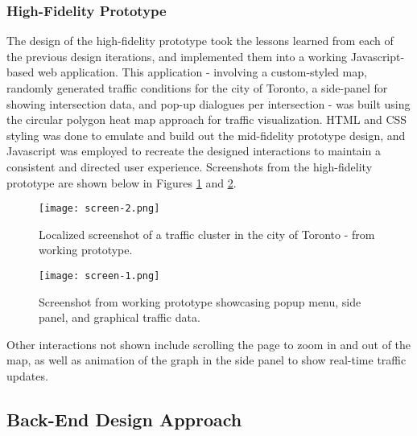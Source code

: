 \documentclass{article}
\begin{document}
\subsubsection{High-Fidelity Prototype}

The design of the high-fidelity prototype took the lessons learned from each of the previous design iterations, and implemented them into a working Javascript-based web application.
This application - involving a custom-styled map, randomly generated traffic conditions for the city of Toronto, a side-panel for showing intersection data, and pop-up dialogues per intersection - was built using the circular polygon heat map approach for traffic visualization.
HTML and CSS styling was done to emulate and build out the mid-fidelity prototype design, and Javascript was employed to recreate the designed interactions to maintain a consistent and directed user experience. Screenshots from the high-fidelity prototype are shown below in Figures \ref{fig:screen-1} and \ref{fig:screen-2}. \\

\begin{figure}[htbp!]
  \begin{centering}
    \texttt{[image: screen-2.png]}
    \caption{Localized screenshot of a traffic cluster in the city of Toronto - from working prototype.}
    \label{fig:screen-1}
  \end{centering}
\end{figure}

\begin{figure}[htbp!]
  \begin{centering}
    \texttt{[image: screen-1.png]}
    \caption{Screenshot from working prototype showcasing popup menu, side panel, and graphical traffic data.}
    \label{fig:screen-2}
  \end{centering}
\end{figure}

Other interactions not shown include scrolling the page to zoom in and out of the map, as well as animation of the graph in the side panel to show real-time traffic updates.\\

\subsection{Back-End Design Approach}
\end{document}
